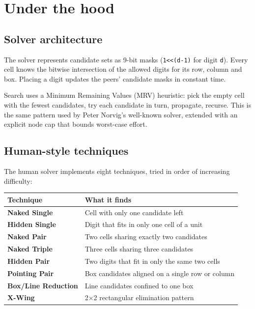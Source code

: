 \section{Under the hood}

\subsection{Solver architecture}

The solver represents candidate sets as 9-bit masks (\texttt{1<<(d-1)}
for digit \texttt{d}). Every cell knows the bitwise intersection of the
allowed digits for its row, column and box. Placing a digit updates the
peers' candidate masks in constant time.

Search uses a Minimum Remaining Values (MRV) heuristic: pick the empty
cell with the fewest candidates, try each candidate in turn, propagate,
recurse. This is the same pattern used by Peter Norvig's well-known
solver, extended with an explicit node cap that bounds worst-case
effort.

\subsection{Human-style techniques}

The human solver implements eight techniques, tried in order of
increasing difficulty:

\begin{center}
\begin{tabular}{>{\color{darkblue}\bfseries}l l}
\rowcolor{lightblue}
Technique & What it finds \\
\hline
Naked Single      & Cell with only one candidate left \\
\rowcolor{softgray}
Hidden Single     & Digit that fits in only one cell of a unit \\
Naked Pair        & Two cells sharing exactly two candidates \\
\rowcolor{softgray}
Naked Triple      & Three cells sharing three candidates \\
Hidden Pair       & Two digits that fit in only the same two cells \\
\rowcolor{softgray}
Pointing Pair     & Box candidates aligned on a single row or column \\
Box/Line Reduction & Line candidates confined to one box \\
\rowcolor{softgray}
X-Wing            & 2$\times$2 rectangular elimination pattern \\
\end{tabular}
\end{center}

